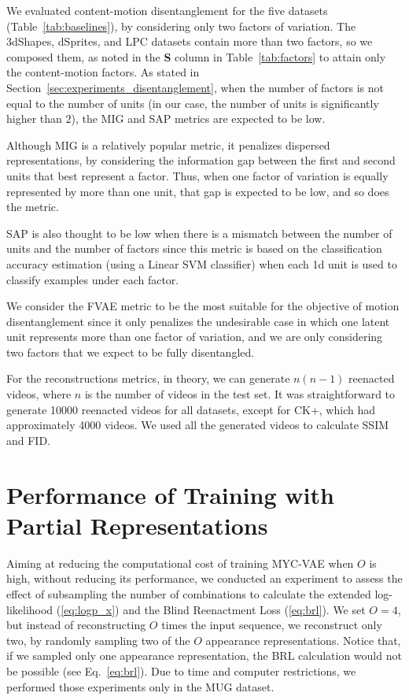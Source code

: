 We evaluated content-motion disentanglement for the five datasets (\cf Table~\ref{tab:baselines}), by considering only two factors of variation.
The 3dShapes, dSprites, and LPC datasets contain more than two factors, so we composed them, as noted in the \textbf{S} column in Table~\ref{tab:factors} to attain only the content-motion factors.
As stated in Section~\ref{sec:experiments_disentanglement}, when the number of factors is not equal to the number of units (in our case, the number of units is significantly higher than $2$), the MIG and SAP metrics are expected to be low.

Although MIG is a relatively popular metric, it penalizes dispersed representations, by considering the information gap between the first and second units that best represent a factor.
Thus, when one factor of variation is equally represented by more than one unit, that gap is expected to be low, and so does the metric.

SAP is also thought to be low when there is a mismatch between the number of units and the number of factors since this metric is based on the classification accuracy estimation (using a Linear SVM classifier) when each 1d unit is used to classify examples under each factor.

We consider the FVAE metric to be the most suitable for the objective of motion disentanglement since it only penalizes the undesirable case in which one latent unit represents more than one factor of variation, and we are only considering two factors that we expect to be fully disentangled.

For the reconstructions metrics, in theory, we can generate $n(n-1)$ reenacted videos, where $n$ is the number of videos in the test set.
It was straightforward to generate \num{10000} reenacted videos for all datasets, except for CK+, which had approximately \num{4000} videos.
We used all the generated videos to calculate SSIM and FID\@.

\section{Performance of Training with Partial Representations}
\label{sec:partial}

Aiming at reducing the computational cost of training MYC-VAE when $O$ is high, without reducing its performance, we conducted an experiment to assess the effect of subsampling the number of combinations to calculate the extended log-likelihood (\ref{eq:logp_x}) and the Blind Reenactment Loss (\ref{eq:brl}).
We set $O=4$, but instead of reconstructing $O$ times the input sequence, we reconstruct only two, by randomly sampling two of the $O$ appearance representations.
Notice that, if we sampled only one appearance representation, the BRL calculation would not be possible (see Eq.~\ref*{eq:brl}).
Due to time and computer restrictions, we performed those experiments only in the MUG dataset.

